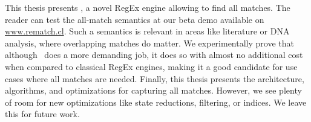 This thesis presents \rematch, a novel RegEx engine allowing to find all
matches. The reader can test the all-match semantics at our beta demo available
on \url{www.rematch.cl}. Such a semantics is relevant in areas like literature
or DNA analysis, where overlapping matches do matter. We experimentally prove
that although \rematch\ does a more demanding job, it does so with almost no
additional cost when compared to classical RegEx engines, making it a good
candidate for use cases where all matches are needed.  Finally, this thesis
presents the architecture, algorithms, and optimizations for capturing all
matches. However, we see plenty of room for new optimizations like state
reductions, filtering, or indices. We leave this for future work.

